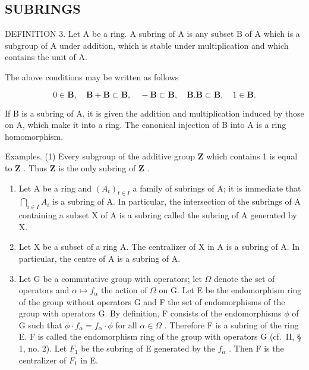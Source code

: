 \subsection{SUBRINGS}

DEFINITION 3. Let A be a ring. A subring of A is any subset B of A which is a subgroup of A under addition, which is stable under multiplication and which contains the unit of A.

The above conditions may be written as follows

\[
0 \in \mathbf {B}, \quad \mathbf {B} + \mathbf {B} \subset \mathbf {B}, \quad - \mathbf {B} \subset \mathbf {B}, \quad \mathbf {B}. \mathbf {B} \subset \mathbf {B}, \quad 1 \in \mathbf {B}.
\]

If B is a subring of A, it is given the addition and multiplication induced by those on A, which make it into a ring. The canonical injection of B into A is a ring homomorphism.

Examples. (1) Every subgroup of the additive group \(\mathbf{Z}\) which contains 1 is equal to \(\mathbf{Z}\) . Thus \(\mathbf{Z}\) is the only subring of \(\mathbf{Z}\) .

\begin{enumerate}
\def\labelenumi{(\arabic{enumi})}
\setcounter{enumi}{1}
\item
  Let A be a ring and \((A_{t})_{t\in I}\) a family of subrings of A; it is immediate that \(\bigcap_{i\in I}A_{i}\) is a subring of A. In particular, the intersection of the subrings of A containing a subset X of A is a subring called the subring of A generated by X.
\item
  Let X be a subset of a ring A. The centralizer of X in A is a subring of A. In particular, the centre of A is a subring of A.
\item
  Let G be a commutative group with operators; let \(\Omega\) denote the set of operators and \(\alpha \mapsto f_{\alpha}\) the action of \(\Omega\) on G. Let E be the endomorphism ring of the group without operators G and F the set of endomorphisms of the group with operators G. By definition, F consists of the endomorphisms \(\phi\) of G such that \(\phi \cdot f_{\alpha} = f_{\alpha} \cdot \phi\) for all \(\alpha \in \Omega\) . Therefore F is a subring of the ring E. F is called the endomorphism ring of the group with operators G (cf.~II, § 1, no. 2). Let \(F_{1}\) be the subring of E generated by the \(f_{\alpha}\) . Then F is the centralizer of \(F_{1}\) in E.
\end{enumerate}

